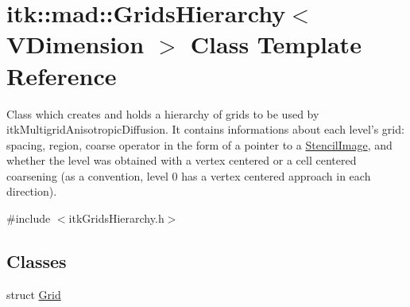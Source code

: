 \hypertarget{classitk_1_1mad_1_1_grids_hierarchy}{\section{itk\-:\-:mad\-:\-:Grids\-Hierarchy$<$ V\-Dimension $>$ Class Template Reference}
\label{classitk_1_1mad_1_1_grids_hierarchy}
}


Class which creates and holds a hierarchy of grids to be used by itk\-Multigrid\-Anisotropic\-Diffusion. It contains informations about each level's grid\-: spacing, region, coarse operator in the form of a pointer to a \hyperlink{classitk_1_1mad_1_1_stencil_image}{Stencil\-Image}, and whether the level was obtained with a vertex centered or a cell centered coarsening (as a convention, level 0 has a vertex centered approach in each direction).  




{\ttfamily \#include $<$itk\-Grids\-Hierarchy.\-h$>$}

\subsection*{Classes}
\begin{DoxyCompactItemize}
\item 
struct \hyperlink{structitk_1_1mad_1_1_grids_hierarchy_1_1_grid}{Grid}
\end{DoxyCompactItemize}
